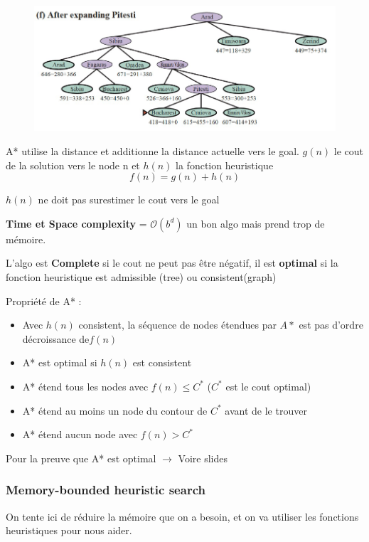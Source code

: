 \begin{figure}[H]
		\end{figure}\begin{figure}[H]
			\centering
			\includegraphics[width=\textwidth]{img/A5.png}
		\end{figure}
		
		A* utilise la distance et additionne la distance actuelle vers le goal. $g(n)$ le cout de la solution vers le node n et $h(n)$ la fonction heuristique
		\begin{equation}
			f(n) = g(n) + h(n)
		\end{equation}
		
		$h(n)$ ne doit pas surestimer le cout vers le goal
		
		\textbf{Time et Space complexity} = $\mathcal{O}(b^d)$ un bon algo mais prend trop de mémoire.
		
		L'algo est \textbf{Complete} si le cout ne peut pas être négatif, il est \textbf{optimal} si la fonction heuristique est admissible (tree) ou consistent(graph)
			
			
		Propriété de A* :
		\begin{itemize}
			\item Avec $h(n)$ consistent, la séquence de nodes étendues par $A*$  est pas d'ordre décroissance de$f(n)$
			\item A* est optimal si $h(n)$ est consistent
			\item A* étend tous les nodes avec $f(n) \leq C^*$ ($C^*$ est le cout optimal)
			\item A* étend au moins un node du contour de $C^*$ avant de le trouver
			\item A* étend aucun node avec $f(n) > C^*$
		\end{itemize}
		
		Pour la preuve que A* est optimal $\rightarrow$ Voire slides
		
		\subsubsection{Memory-bounded heuristic search}
		On tente ici de réduire la mémoire que on a besoin, et on va utiliser les fonctions heuristiques pour nous aider.
		
